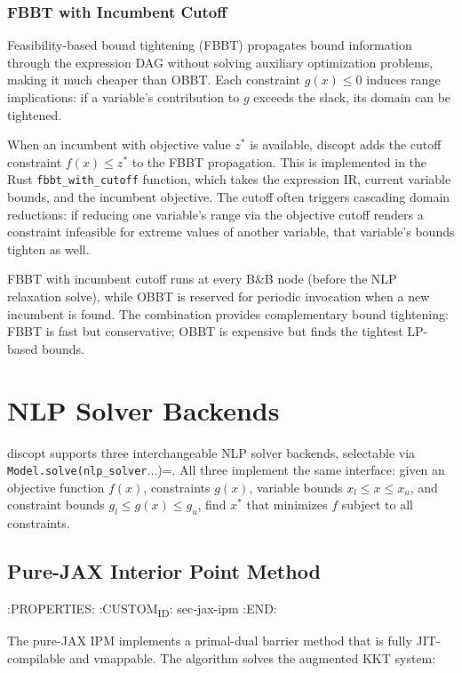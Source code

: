 \documentclass[12pt,preprint]{article}
\begin{document}
\subsubsection{FBBT with Incumbent Cutoff}
\label{org-fbbt-incumbent-cutoff}
Feasibility-based bound tightening (FBBT) \cite{Belotti2009,Ryoo1996} propagates bound information through the expression DAG without solving auxiliary optimization problems, making it much cheaper than OBBT. Each constraint $g(x) \le 0$ induces range implications: if a variable's contribution to $g$ exceeds the slack, its domain can be tightened.

When an incumbent with objective value $z^*$ is available, discopt adds the cutoff constraint $f(x) \le z^*$ to the FBBT propagation. This is implemented in the Rust \texttt{fbbt\_with\_cutoff} function, which takes the expression IR, current variable bounds, and the incumbent objective. The cutoff often triggers cascading domain reductions: if reducing one variable's range via the objective cutoff renders a constraint infeasible for extreme values of another variable, that variable's bounds tighten as well.

FBBT with incumbent cutoff runs at every B\&B node (before the NLP relaxation solve), while OBBT is reserved for periodic invocation when a new incumbent is found. The combination provides complementary bound tightening: FBBT is fast but conservative; OBBT is expensive but finds the tightest LP-based bounds.

\section{NLP Solver Backends}
\label{org-nlp-solver-backends}
discopt supports three interchangeable NLP solver backends, selectable via \texttt{Model.solve(nlp\_solver}...)=. All three implement the same interface: given an objective function $f(x)$, constraints $g(x)$, variable bounds $x_l \le x \le x_u$, and constraint bounds $g_l \le g(x) \le g_u$, find $x^*$ that minimizes $f$ subject to all constraints.

\subsection{Pure-JAX Interior Point Method}
\label{org-pure-jax-interior-point-method}
   :PROPERTIES:
   :CUSTOM\textsubscript{ID}: sec-jax-ipm
   :END:


The pure-JAX IPM implements a primal-dual barrier method that is fully JIT-compilable and vmappable. The algorithm solves the augmented KKT system:
\end{document}
